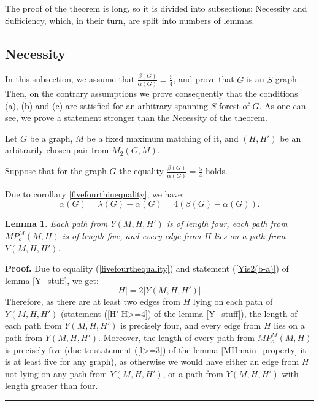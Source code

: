 \documentclass[a4paper, 12pt]{article}
\newtheorem{lemma}{Lemma}[subsection]
\newenvironment{proof}[1][Proof]{\noindent\textbf{#1.} }{\ \rule{0.5em}{0.5em}}
\begin{document}
The proof of the theorem is long, so it is divided into subsections:
Necessity and Sufficiency, which, in their turn, are split into
numbers of lemmas.


\subsection{Necessity}

In this subsection, we assume that
$\frac{\beta(G)}{\alpha(G)}=\frac{5}{4}$, and prove that $G$ is an
$S$-graph. Then, on the contrary assumptions we prove consequently
that the conditions (a), (b) and (c) are satisfied for an arbitrary
spanning $S$-forest of $G$. As one can see, we prove a statement
stronger than the Necessity of the theorem.

\bigskip

Let $G$ be a graph, $M$ be a fixed maximum matching of it, and
$(H,H')$ be an arbitrarily chosen pair from $M_2(G, M)$.

Suppose that for the graph $G$ the equality
$\frac{\beta(G)}{\alpha(G)}=\frac{5}{4}$ holds.

Due to corollary \ref{fivefourthinequality}, we have:
\renewcommand{\theequation}{\fnsymbol{equation}}
\setcounter{equation}{2}
\begin{equation}\label{fivefourthequality}
\alpha(G) = \lambda(G) - \alpha(G) = 4(\beta(G) - \alpha(G)).
\end{equation}

\begin{lemma}\label{MH5_HH'4}
Each path from $Y(M,H,H')$ is of length four, each path from
$MP_o^M(M,H)$ is of length five, and every edge from $H$ lies on a
path from $Y(M,H,H')$.
\end{lemma}
\begin{proof}
Due to equality (\ref{fivefourthequality}) and statement
(\ref{Yis2(b-a)}) of lemma \ref{Y_stuff}, we get:
$$|H| = 2|Y(M,H,H')|.$$
Therefore, as there are at least two edges from $H$ lying on each
path of $Y(M,H,H')$ (statement (\ref{H'-H>=4}) of the lemma
\ref{Y_stuff}), the length of each path from $Y(M,H,H')$ is
precisely four, and every edge from $H$ lies on a path from
$Y(M,H,H')$. Moreover, the length of every path from $MP_o^M(M,H)$
is precisely five (due to statement (\ref{l>=3}) of the lemma
\ref{MHmain_property} it is at least five for any graph), as
otherwise we would have either an edge from $H$ not lying on any
path from $Y(M,H,H')$, or a path from $Y(M,H,H')$ with length
greater than four.
\end{proof}
\end{document}
